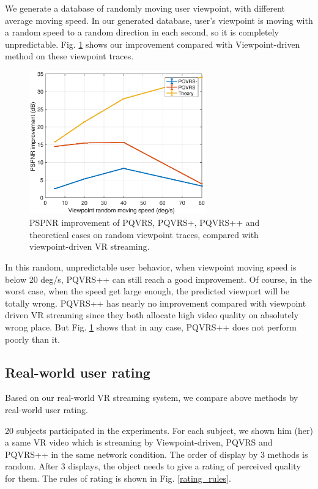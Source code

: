We generate a database of randomly moving user viewpoint, with different average moving speed. In our generated database, user's viewpoint is moving with a random speed to a random direction in each second, so it is completely unpredictable. Fig. \ref{random_improvement} shows our improvement compared with Viewpoint-driven method on these viewpoint traces.

    \begin{figure}
  \centering
  \includegraphics[width=3in]{images/random_improvement.eps}
  \caption{PSPNR improvement of PQVRS, PQVRS+, PQVRS++ and theoretical cases on random viewpoint traces, compared with viewpoint-driven VR streaming.}
  \label{random_improvement}
  \end{figure}

In this random, unpredictable user behavior, when viewpoint moving speed is below 20 deg/s, PQVRS++ can still reach a good improvement. Of course, in the worst case, when the speed get large enough, the predicted viewport will be totally wrong. PQVRS++ has nearly no improvement compared with viewpoint driven VR streaming since they both allocate high video quality on absolutely wrong place. But Fig. \ref{random_improvement} shows that in any case, PQVRS++ does not perform poorly than it.

\subsection{Real-world user rating}

Based on our real-world VR streaming system, we compare above methods by real-world user rating. 

20 subjects participated in the experiments. For each subject, we shown him (her) a same VR video which is streaming by Viewpoint-driven, PQVRS and PQVRS++ in the same network condition. The order of display by 3 methods is random. After 3 displays, the object needs to give a rating of perceived quality for them. The rules of rating is shown in Fig. \ref{rating_rules}.

